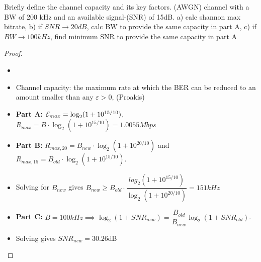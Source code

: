 \documentclass[./answersheet.tex]{subfiles}
\begin{document}
\begin{wts}
    Briefly define the channel capacity and its key factors. (AWGN) channel with a BW of 200 kHz and an available signal-(SNR) of 15dB. a) calc shannon max bitrate, b) if $SNR\to20dB$, calc BW to provide the same capacity in part A, c) if $BW\to 100kHz$, find minimum SNR to provide the same capacity in part A
\end{wts}
\begin{proof}
\begin{itemize}[noitemsep]
    \item[]
    \item Channel capacity: the maximum rate at which the BER can be reduced to an amount smaller than any $\varepsilon>0$, (Proakis)
    \item\textbf{Part A: } $\mathcal{E}_{max}=\log_2(1+10^{15/10})$, $R_{max}=B\cdot\log_{2}(1+10^{15/10})=1.0055Mbps$
    \item\textbf{Part B: } $R_{max,20}=B_{new}\cdot\log_2(1+10^{20/10})$ and $R_{max,15}=B_{old}\cdot\log_2(1+10^{15/10})$. 
    \item Solving for $B_{new}$ gives $B_{new}\geq B_{old}\cdot\dfrac{log_2(1+10^{15/10})}{\log_2(1+10^{20/10})}
    =151kHz$
    \item\textbf{Part C: } $B=100kHz\implies \log_2(1+{SNR}_{new})=\dfrac{B_{old}}{B_{new}}\log_2(1+{SNR}_{old})$.
    \item Solving gives ${SNR}_{new}=30.26$dB
\end{itemize}
    
\end{proof}
\end{document}
